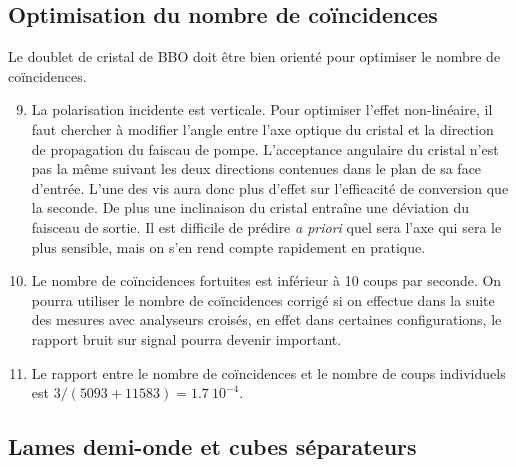 \documentclass[twocolumn, 10pt]{article}
\begin{document}
\subsection{Optimisation du nombre de coïncidences}

\par Le doublet de cristal de BBO doit être bien orienté pour optimiser le nombre de coïncidences.

\begin{enumerate}
\setcounter{enumi}{8}
    \item \par La polarisation incidente est verticale. Pour optimiser l'effet non-linéaire, il faut chercher à modifier l'angle entre l'axe optique du cristal et la direction de propagation du faiscau de pompe. L'acceptance angulaire du cristal n'est pas la même suivant les deux directions contenues dans le plan de sa face d'entrée. L'une des vis aura donc plus d'effet sur l'efficacité de conversion que la seconde. De plus une inclinaison du cristal entraîne une déviation du faisceau de sortie. Il est difficile de prédire \textit{a priori} quel sera l'axe qui sera le plus sensible, mais on s'en rend compte rapidement en pratique.
    \item \par Le nombre de coïncidences fortuites est inférieur à 10 coups par seconde. On pourra utiliser le nombre de coïncidences corrigé si on effectue dans la suite des mesures avec analyseurs croisés, en effet dans certaines configurations, le rapport bruit sur signal pourra devenir important.
    \item Le rapport entre le nombre de coïncidences et le nombre de coups individuels est $3/(5093+11583)=1.7 \ 10^{-4}$.
\end{enumerate}

\subsection{Lames demi-onde et cubes séparateurs}
\end{document}
